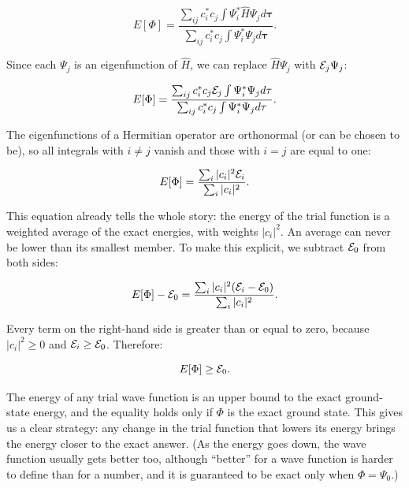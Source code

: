 \documentclass[
  english,
  9pt,
]{extbook}
\theoremstyle{definition}
\theoremstyle{definition}
\theoremstyle{definition}
\theoremstyle{definition}
\theoremstyle{remark}
\begin{document}
\begin{equation}
E[\Phi] = \frac{\sum_{ij} c_i^* c_j \int \Psi_i^* {\hat H} \Psi_jd\mathbf{\tau}}{
\sum_{ij} c_i^* c_j \int \Psi_i^* \Psi_jd\mathbf{\tau}}.
\label{eq:var3}
\end{equation}

Since each \(\Psi_j\) is an eigenfunction of \({\hat H}\), we can replace \({\hat H} \Psi_j\) with \({\cal E}_j \Psi_j\):

\begin{equation}
E[\Phi] = \frac{\sum_{ij} c_i^* c_j {\cal E}_j \int \Psi_i^* \Psi_j d\mathbf{\tau}}{
\sum_{ij} c_i^* c_j \int \Psi_i^* \Psi_j d\mathbf{\tau}}.
\label{eq:var4}
\end{equation}

The eigenfunctions of a Hermitian operator are orthonormal (or can be chosen to be), so all integrals with \(i\neq j\) vanish and those with \(i=j\) are equal to one:

\begin{equation}
E[\Phi] = \frac{\sum_{i} |c_i|^2 {\cal E}_i}{\sum_{i} |c_i|^2}.
\label{eq:var5}
\end{equation}

This equation already tells the whole story: the energy of the trial function is a weighted average of the exact energies, with weights \(|c_i|^2\). An average can never be lower than its smallest member. To make this explicit, we subtract \({\cal E}_0\) from both sides:

\begin{equation}
E[\Phi] - {\cal E}_0 = \frac{\sum_i |c_i|^2 ( {\cal E}_i - {\cal E}_0)}{
\sum_i |c_i|^2}.
\label{eq:var6}
\end{equation}

Every term on the right-hand side is greater than or equal to zero, because \(|c_i|^2\geq0\) and \({\cal E}_i \geq {\cal E}_0\). Therefore:

\begin{equation}
E[\Phi] \geq {\cal E}_0.
\label{eq:varprinciple}
\end{equation}

The energy of any trial wave function is an upper bound to the exact ground-state energy, and the equality holds only if \(\Phi\) is the exact ground state. This gives us a clear strategy: any change in the trial function that lowers its energy brings the energy closer to the exact answer. (As the energy goes down, the wave function usually gets better too, although ``better'' for a wave function is harder to define than for a number, and it is guaranteed to be exact only when \(\Phi = \Psi_0\).)
\end{document}
